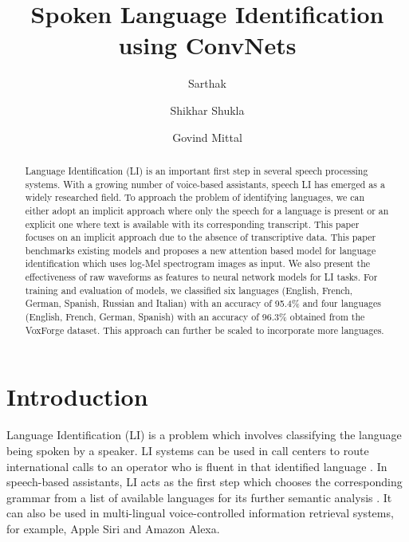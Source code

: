 \documentclass[runningheads]{llncs}
\begin{document}
\title{Spoken Language Identification using ConvNets}
\author{Sarthak \and
Shikhar Shukla \and
Govind Mittal}
\maketitle              \begin{abstract}
Language Identification (LI) is an important first step in several speech processing systems. With a growing number of voice-based assistants, speech LI has emerged as a widely researched field. To approach the problem of identifying languages, we can either adopt an implicit approach where only the speech for a language is present or an explicit one where text is available with its corresponding transcript. This paper focuses on an implicit approach due to the absence of transcriptive data. This paper benchmarks existing models and proposes a new attention based model for language identification which uses log-Mel spectrogram images as input. We also present the effectiveness of raw waveforms as features to neural network models for LI tasks. For training and evaluation of models, we classified six languages (English, French, German, Spanish, Russian and Italian) with an accuracy of 95.4\% and four languages (English, French, German, Spanish) with an accuracy of 96.3\% obtained from the VoxForge dataset. This approach can further be scaled to incorporate more languages.

\end{abstract}
\section{Introduction}
Language Identification (LI) is a problem which involves classifying the language being spoken by a speaker. LI systems can be used in call centers to route international calls to an operator who is fluent in that identified language \cite{kumar2010spoken}. In speech-based assistants, LI acts as the first step which chooses the corresponding grammar from a list of available languages for its further semantic analysis \cite{bartz2017language}. It can also be used in multi-lingual voice-controlled information retrieval systems, for example, Apple Siri and Amazon Alexa.
\end{document}
